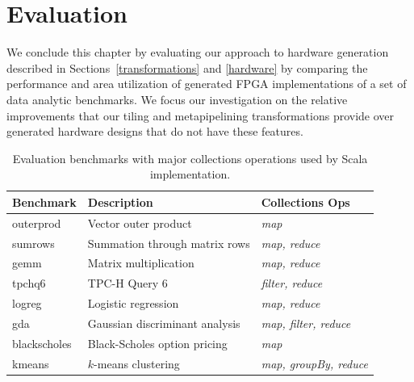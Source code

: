 \section{Evaluation}
\label{delite-evaluation}


We conclude this chapter by evaluating our approach to hardware generation
described in Sections~\ref{transformations} and \ref{hardware} by comparing the performance and
area utilization of generated FPGA implementations of a set of data analytic benchmarks.
We focus our investigation on the relative improvements that our tiling and metapipelining transformations
provide over generated hardware designs that do not have these features.

\begin{table}
\centering\footnotesize
\hspace{-0.022\textwidth}\begin{tabular}{lll}
\toprule

{\bf Benchmark} & {\bf Description} & {\bf Collections Ops}\\ \midrule
outerprod & Vector outer product & \emph{map}\\ \midrule
sumrows & Summation through matrix rows & \emph{map, reduce}\\ \midrule
gemm & Matrix multiplication & \emph{map, reduce}\\ \midrule
tpchq6 & TPC-H Query 6 & \emph{filter, reduce}\\ \midrule
logreg & Logistic regression & \emph{map, reduce}\\ \midrule
gda & Gaussian discriminant analysis & \emph{map, filter, reduce}\\ \midrule
blackscholes & Black-Scholes option pricing & \emph{map}\\ \midrule
kmeans & $k$-means clustering & \emph{map, groupBy, reduce}\\ \bottomrule
\end{tabular}

\caption{Evaluation benchmarks with major collections operations used by
Scala implementation.}
\label{table:benchmarks}
\end{table}

